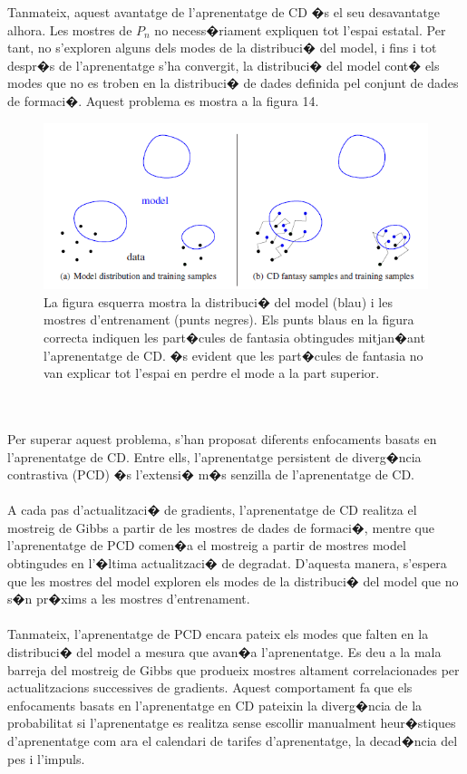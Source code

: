 \documentclass[12pt,a4paper,openright,oneside]{article}
\numberwithin{equation}{section}
\theoremstyle{definition}
\begin{document}
Tanmateix, aquest avantatge de l'aprenentatge de CD �s el seu desavantatge alhora. Les mostres de ${P_n}$ no necess�riament expliquen tot l'espai estatal. Per tant, no s'exploren alguns dels modes de la distribuci� del model, i fins i tot despr�s de l'aprenentatge s'ha convergit, la distribuci� del model cont� els modes que no es troben en la distribuci� de dades definida pel conjunt de dades de formaci�. Aquest problema es mostra a la figura 14.
\begin{figure}[h!]
\begin{center}
\includegraphics[width=\textwidth]{model}
\caption{La figura esquerra mostra la distribuci� del model (blau) i les mostres d'entrenament (punts negres). Els punts blaus en la figura correcta indiquen les part�cules de fantasia obtingudes mitjan�ant l'aprenentatge de CD. �s evident que les part�cules de fantasia no van explicar tot l'espai en perdre el mode a la part superior.}
\end{center}
\end{figure}
\\\\
Per superar aquest problema, s'han proposat diferents enfocaments basats en l'aprenentatge de CD. Entre ells, l'aprenentatge persistent de diverg�ncia contrastiva (PCD) �s l'extensi� m�s senzilla de l'aprenentatge de CD.\\\\
A cada pas d'actualitzaci� de gradients, l'aprenentatge de CD realitza el mostreig de Gibbs a partir de les mostres de dades de formaci�, mentre que l'aprenentatge de PCD comen�a el mostreig a partir de mostres model obtingudes en l'�ltima actualitzaci� de degradat. D'aquesta manera, s'espera que les mostres del model exploren els modes de la distribuci� del model que no s�n pr�xims a les mostres d'entrenament.\\\\
Tanmateix, l'aprenentatge de PCD encara pateix els modes que falten en la distribuci� del model a mesura que avan�a l'aprenentatge. Es deu a la mala barreja del mostreig de Gibbs que produeix mostres altament correlacionades per actualitzacions successives de gradients. Aquest comportament fa que els enfocaments basats en l'aprenentatge en CD pateixin la diverg�ncia de la probabilitat si l'aprenentatge es realitza sense escollir manualment heur�stiques d'aprenentatge com ara el calendari de tarifes d'aprenentatge, la decad�ncia del pes i l'impuls.\\\\
\end{document}

